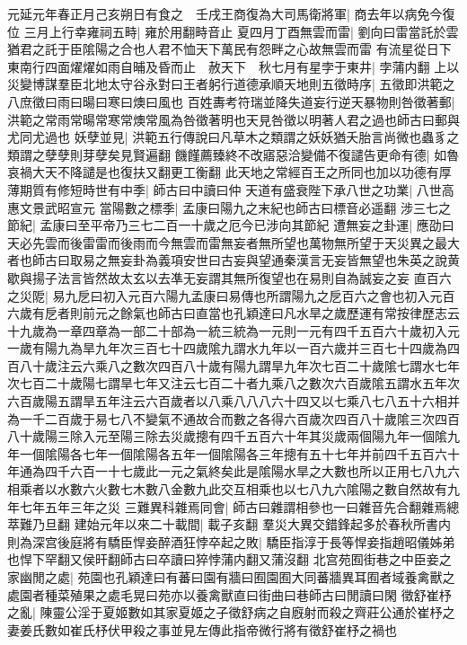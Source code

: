 元延元年春正月己亥朔日有食之　壬戌王商復為大司馬衛將軍|{
	商去年以病免今復位}
三月上行幸雍祠五畤|{
	雍於用翻畤音止}
夏四月丁酉無雲而雷|{
	劉向曰雷當託於雲猶君之託于臣隂陽之合也人君不恤天下萬民有怨畔之心故無雲而雷}
有流星從日下東南行四面燿燿如雨自晡及昏而止　赦天下　秋七月有星孛于東井|{
	孛蒲内翻}
上以災變博謀羣臣北地太守谷永對曰王者躬行道德承順天地則五徵時序|{
	五徵即洪範之八庶徵曰雨曰暘曰寒曰燠曰風也}
百姓夀考符瑞並降失道妄行逆天暴物則咎徵著郵|{
	洪範之常雨常暘常寒常燠常風為咎徵著明也天見咎徵以明著人君之過也師古曰郵與尤同尤過也}
妖孽並見|{
	洪範五行傳說曰凡草木之類謂之妖妖猶夭胎言尚微也蟲豸之類謂之孽孽則芽孽矣見賢遍翻}
饑饉薦臻終不改寤惡洽變備不復譴告更命有德|{
	如魯哀禍大天不降譴是也復扶又翻更工衡翻}
此天地之常經百王之所同也加以功德有厚薄期質有修短時世有中季|{
	師古曰中讀曰仲}
天道有盛衰陛下承八世之功業|{
	八世高惠文景武昭宣元}
當陽數之標季|{
	孟康曰陽九之末紀也師古曰標音必遥翻}
涉三七之節紀|{
	孟康曰至平帝乃三七二百一十歲之厄今已涉向其節紀}
遭無妄之卦運|{
	應劭曰天必先雲而後雷雷而後雨而今無雲而雷無妄者無所望也萬物無所望于天災異之最大者也師古曰取易之無妄卦為義項安世曰古妄與望通秦漢言无妄皆無望也朱英之說黄歇與揚子法言皆然故太玄以去凖无妄謂其無所復望也在易則自為誠妄之妄}
直百六之災阸|{
	易九戹曰初入元百六陽九孟康曰易傳也所謂陽九之戹百六之會也初入元百六歲有戹者則前元之餘氣也師古曰直當也孔穎達曰凡水旱之歲歷運有常按律歷志云十九歲為一章四章為一部二十部為一統三統為一元則一元有四千五百六十歲初入元一歲有陽九為旱九年次三百七十四歲隂九謂水九年以一百六歲并三百七十四歲為四百八十歲注云六乘八之數次四百八十歲有陽九謂旱九年次七百二十歲隂七謂水七年次七百二十歲陽七謂旱七年又注云七百二十者九乘八之數次六百歲隂五謂水五年次六百歲陽五謂旱五年注云六百歲者以八乘八八八六十四又以七乘八七八五十六相并為一千二百歲于易七八不變氣不通故合而數之各得六百歲次四百八十歲隂三次四百八十歲陽三除入元至陽三除去災歲摠有四千五百六十年其災歲兩個陽九年一個隂九年一個隂陽各七年一個隂陽各五年一個隂陽各三年摠有五十七年并前四千五百六十年通為四千六百一十七歲此一元之氣終矣此是隂陽水旱之大數也所以正用七八九六相乘者以水數六火數七木數八金數九此交互相乘也以七八九六隂陽之數自然故有九年七年五年三年之災}
三難異科雜焉同會|{
	師古曰雜謂相參也一曰雜音先合翻雜焉總萃難乃旦翻}
建始元年以來二十載間|{
	載子亥翻}
羣災大異交錯鋒起多於春秋所書内則為深宫後庭將有驕臣悍妾醉酒狂悖卒起之敗|{
	驕臣指淳于長等悍妾指趙昭儀姊弟也悍下罕翻又侯旰翻師古曰卒讀曰猝悖蒲内翻又蒲沒翻}
北宫苑囿街巷之中臣妾之家幽閒之處|{
	苑園也孔穎達曰有蕃曰園有牆曰囿園囿大同蕃牆異耳囿者域養禽獸之處園者種菜殖果之處毛晃曰苑亦以養禽獸直曰街曲曰巷師古曰閒讀曰閑}
徵舒崔杼之亂|{
	陳靈公淫于夏姬數如其家夏姬之子徵舒病之自廐射而殺之齊莊公通於崔杼之妻姜氏數如崔氏杼伏甲殺之事並見左傳此指帝微行將有徵舒崔杼之禍也}

